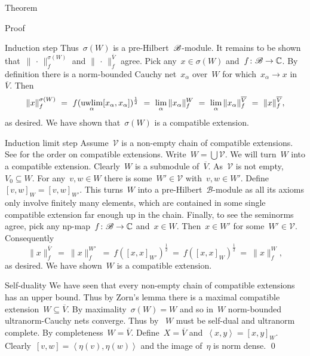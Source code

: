 \begin{parsec}
\begin{point}{Theorem}
\begin{point}{Proof}
\begin{point}{Induction step}
Thus~$\sigma(W)$ is a pre-Hilbert~$\mathscr{B}$-module.
It remains to be shown that~$\|\,\cdot\,\|_f^{\sigma(W)}$
    and $\|\,\cdot\,\|_f^{\overline{V}}$
    agree.
Pick any~$x \in \sigma(W)$ and~$f\colon \mathscr{B} \to \mathbb{C}$.
By definition there is a norm-bounded Cauchy net~$x_\alpha$ over~$W$
    for which~$x_\alpha \to x$ in~$\overline{V}$.
Then
\begin{equation*}
    \|x\|^{\sigma(W)}_f
       \ =\ f(\uwlim_\alpha [x_\alpha,x_\alpha])^{\frac{1}{2}}
       \ =\ \lim_\alpha \|x_\alpha\|_f^W
       \ =\ \lim_\alpha \|x_\alpha\|_f^{\overline{V}}
       \ =\ \|x\|_f^{\overline{V}},
\end{equation*}
as desired.
We have shown that~$\sigma(W)$ is a compatible extension.
\end{point}
\begin{point}{Induction limit step}%
    Assume~$\mathscr{V}$
        is a non-empty chain of compatible extensions.
        See  for the order on compatible extensions.
    Write~$W = \bigcup \mathscr{V}$.
    We will turn~$W$ into a compatible extension.
    Clearly~$W$ is a submodule of~$\overline{V}$.
    As~$\mathscr{V}$ is not empty, $V_0 \subseteq W$.
    For any~$v,w \in W$
    there is some~$W' \in \mathscr{V}$ with~$v,w \in W'$.
    Define~$[v,w]_W = [v,w]_{W'}$.
    This turns~$W$ into a pre-Hilbert~$\mathscr{B}$-module
        as all its axioms only involve finitely many elements,
        which are contained in some single compatible extension far enough up
        in the chain.
    Finally, to see the seminorms agree,
        pick any np-map~$f\colon \mathscr{B} \to \mathbb{C}$
        and~$x \in W$.
    Then~$x \in W'$ for some~$W' \in \mathscr{V}$.
    Consequently
    \begin{equation*}
        \|x\|^{\overline{V}}_f
        \ =\ \|x\|^{W'}_f
        \ =\ f([x,x]_{W'})^{\frac{1}{2}}
        \ =\ f([x,x]_{W})^{\frac{1}{2}}
        \ =\  \|x\|^{W}_f,
    \end{equation*}
    as desired.  We have shown~$W$ is a compatible extension.
\end{point}
\begin{point}{Self-duality}
    We have seen
    that every non-empty chain of compatible extensions
        has an upper bound.
    Thus by Zorn's lemma there is a maximal compatible
        extension~$W\subseteq \overline{V}$.
    By maximality~$\sigma(W) = W$
        and so in~$W$ norm-bounded ultranorm-Cauchy nets converge.
    Thus by~
        $W$ must be self-dual and ultranorm complete.
    By completeness~$W = \overline{V}$.
    Define~$X = \overline{V}$
        and~$\left<x,y\right> = [x,y]_{W}$.
    Clearly~$[v,w] = \left<\eta(v),\eta(w)\right>$
        and the image of~$\eta$ is norm dense. \qed
\end{point}
\end{point}
\end{point}
\end{parsec}
